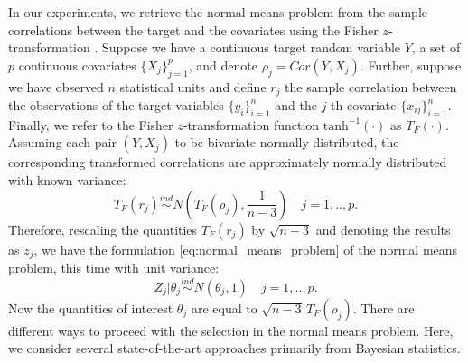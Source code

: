 \documentclass[american,]{article}
\theoremstyle{definition}
\begin{document}
In our experiments, we retrieve the normal means problem from the
sample correlations between the target and the covariates using the
Fisher $z$-transformation \citep{hawkins1989using}. Suppose we have a
continuous target random variable $Y$, a set of $p$ continuous
covariates $\{X_{j}\}_{j=1}^{p}$, and denote
$\rho_{j}=Cor(Y,X_{j})$. Further, suppose we have observed $n$
statistical units and define $r_{j}$ the sample correlation between
the observations of the target variables $\{y_{i}\}_{i=1}^{n}$ and the
$j$-th covariate $\{x_{ij}\}_{i=1}^{n}$. Finally, we refer to the
Fisher $z$-transformation function $\text{tanh}^{-1}(\cdot)$ as
$T_{F}(\cdot)$. Assuming each pair $(Y,X_{j})$ to be bivariate
normally distributed, the corresponding transformed correlations are
approximately normally distributed with known variance: \
\begin{equation} \label{eq:fisher_transformation}
T_{F}(r_{j})\overset{ind}{\sim} N(T_{F}(\rho_{j}),\frac{1}{n-3}) \quad j=1,..,p.
\end{equation}
Therefore, rescaling the quantities $T_{F}(r_{j})$ by $\sqrt{n-3}$ and
denoting the results as $z_{j}$, we have the formulation
\eqref{eq:normal_means_problem} of the normal means problem, this time
with unit variance: \
\begin{equation} \label{eq:normal_means_problem2}
Z_{j}|\theta_{j}\overset{ind}{\sim}N(\theta_{j},1) \quad j=1,..,p.
\end{equation}
Now the quantities of interest $\theta_{j}$ are equal to
$\sqrt{n-3}\,T_{F}(\rho_{j})$. There are different ways to proceed
with the selection in the normal means problem. Here, we consider
several state-of-the-art approaches primarily from Bayesian
statistics.
\end{document}
